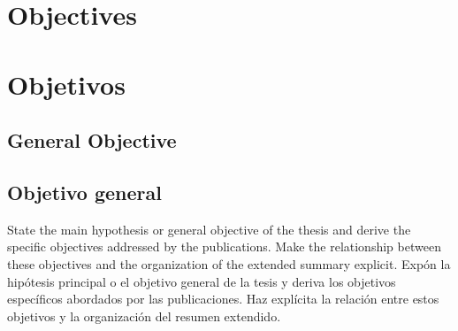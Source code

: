 %

{
  \chapter{Objectives}
}
{
  \chapter{Objetivos}
}
\label{cha:compendium-objectives}

{
  \section{General Objective}
}
{
  \section{Objetivo general}
}

{
  State the main hypothesis or general objective of the thesis and derive the specific objectives addressed by the publications. Make the relationship between these objectives and the organization of the extended summary explicit.
}
{
  Expón la hipótesis principal o el objetivo general de la tesis y deriva los objetivos específicos abordados por las publicaciones. Haz explícita la relación entre estos objetivos y la organización del resumen extendido.
}

